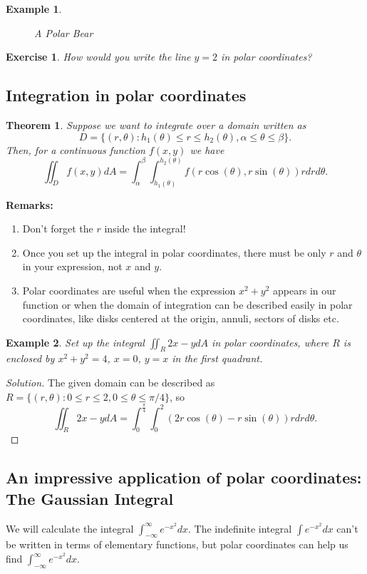\documentclass[12pt]{article}
\newenvironment{solution}
  {\begin{proof}[Solution]}
  {\end{proof}}
\newtheorem{example}{Example}
\newtheorem{exercise}{Exercise}
\newtheorem{theorem}{Theorem}
\begin{document}
\begin{example}
\begin{figure}
\begin{minipage}{5cm}
\caption{A Polar Bear}
\label{polarbear}
\end{minipage}
\end{figure}







\end{example}

\begin{exercise}How would you write the line $y=2 $ in polar coordinates?
\end{exercise}

\subsection*{Integration in polar coordinates}
\begin{theorem}
Suppose we want to integrate over a domain written as $$D=\{(r,\theta):h_1(\theta)\leq r \leq h_2(\theta), \alpha\leq \theta \leq \beta\}.$$ Then, for a continuous function $f(x,y)$ we have $$\iint_Df(x,y) dA=\int_\alpha^\beta\int_{h_1(\theta)}^{h_2(\theta)}f(r\cos(\theta),r\sin(\theta))r dr d\theta.$$
\end{theorem}

\textbf{Remarks:}\begin{enumerate}
\item Don't forget the $r$ inside the integral!
\item Once you set up the integral in polar coordinates, there must be only $r$ and $\theta$ in your expression, not $x$ and $y$.
\item Polar coordinates are useful when the expression $x^2+y^2$ appears in our function or when the domain of integration can be described easily in polar coordinates, like disks centered at the origin, annuli, sectors of disks etc.
\end{enumerate}


\begin{example}
Set up the integral $\iint_R 2x-y dA$ in polar coordinates, where $R$ is enclosed by $x^2+y^2=4$, $x=0$, $y=x$ in the first quadrant.
\end{example}
\begin{solution} The given domain can be described as $R=\{(r,\theta):0\leq r\leq 2, 0\leq \theta\leq \pi/4\}$, so $$\iint_R 2x-y dA=\int_0^{\frac{\pi}{4}}\int_0^2(2r\cos(\theta)-r\sin(\theta))rdrd
\theta.$$
\end{solution}


\subsection*{An impressive application of polar coordinates: The Gaussian Integral}
We will calculate the integral $\int_{-\infty}^\infty e^{-x^2}dx$. The indefinite integral $\int e^{-x^2}dx$ can't be written in terms of elementary functions, but polar coordinates can help us find $\int_{-\infty}^\infty e^{-x^2}dx$.
\end{document}
